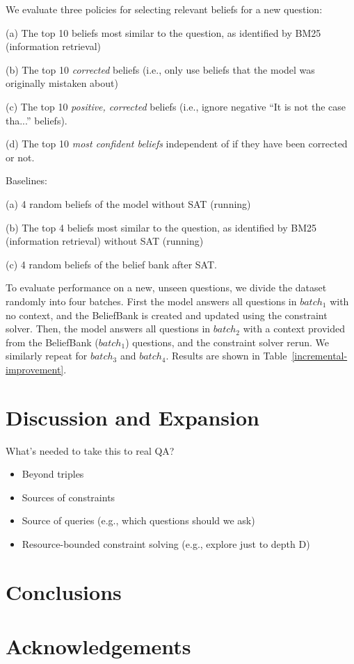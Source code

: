 \documentclass[11pt]{article}
\newenvironment{ite}{                     %
     \parskip 0cm \begin{itemize} \parskip 0cm \parsep 0cm \itemsep 0cm \topsep 0cm}{
        \end{itemize}} %
\newenvironment{des}{                 %
     \parskip 0cm \begin{list}{}{\parsep 0cm \itemsep 0cm \topsep 0cm}}{
       \end{list}} %
\begin{document}
We evaluate three policies for selecting relevant beliefs for a new question:
\begin{des}
\item[(a)] The top 10 beliefs most similar to the question, as identified by BM25 (information retrieval)
\item[(b)] The top 10 {\it corrected} beliefs (i.e., only use beliefs that the model was originally mistaken about)
\item[(c)] The top 10 {\it positive, corrected} beliefs (i.e., ignore negative ``It is not the case tha...'' beliefs).
\item[(d)] The top 10 {\it most confident beliefs} independent of if they have been corrected or not.
\end{des}

Baselines:
\begin{des}
\item[(a)] 4 random beliefs of the model without SAT (running)
\item[(b)] The top 4 beliefs most similar to the question, as identified by BM25 (information retrieval) without SAT (running)
\item[(c)] 4 random beliefs of the belief bank after SAT.
\end{des}

To evaluate performance on a new, unseen questions,
we divide the dataset randomly into four batches.
First the model answers all questions in $batch_1$ with no context, and the BeliefBank
is created and updated using the constraint solver. Then, the model answers all
questions in $batch_2$ with a context provided from the BeliefBank ($batch_1$) questions,
and the constraint solver rerun. We similarly repeat for $batch_3$ and $batch_4$.
Results are shown in Table~\ref{incremental-improvement}.

\section{Discussion and Expansion}

What's needed to take this to real QA? 
\begin{ite}
\item Beyond triples
\item Sources of constraints
\item Source of queries (e.g., which questions should we ask)
\item Resource-bounded constraint solving (e.g., explore just to depth D)
\end{ite}

\section{Conclusions}

\section*{Acknowledgements}




\end{document}
